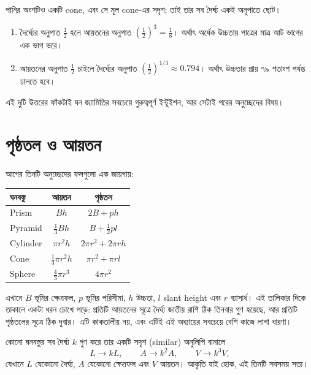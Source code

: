 \documentclass[11pt]{article}
\begin{document}
\begin{sol}
পানির অংশটিও একটি cone, এবং সে মূল cone-এর সদৃশ; তাই তার সব দৈর্ঘ্য একই অনুপাতে
ছোট।
\begin{enumerate}
  \item দৈর্ঘ্যের অনুপাত $\tfrac{1}{2}$ হলে আয়তনের অনুপাত
        $\left( \tfrac{1}{2} \right)^{3} = \tfrac{1}{8}$। অর্থাৎ অর্ধেক উচ্চতায়
        পাত্রের মাত্র আট ভাগের এক ভাগ ভরে।
  \item আয়তনের অনুপাত $\tfrac{1}{2}$ চাইলে দৈর্ঘ্যের অনুপাত
        $\left( \tfrac{1}{2} \right)^{1/3} \approx 0.794$। অর্থাৎ উচ্চতার প্রায়
        ৭৯ শতাংশ পর্যন্ত ঢালতে হবে।
\end{enumerate}
এই দুটি উত্তরের ফাঁকটাই ঘন জ্যামিতির সবচেয়ে গুরুত্বপূর্ণ ইন্টুইশন, আর সেটাই পরের
অনুচ্ছেদের বিষয়।
\end{sol}

\section{পৃষ্ঠতল ও আয়তন}

আগের তিনটি অনুচ্ছেদের ফলগুলো এক জায়গায়:

\begin{center}
\begin{tabular}{l|c|c}
 ঘনবস্তু & আয়তন & পৃষ্ঠতল \\ \hline
 Prism & $Bh$ & $2B + p h$ \\
 Pyramid & $\tfrac{1}{3}Bh$ & $B + \tfrac{1}{2} p l$ \\
 Cylinder & $\pi r^{2} h$ & $2\pi r^{2} + 2\pi r h$ \\
 Cone & $\tfrac{1}{3}\pi r^{2} h$ & $\pi r^{2} + \pi r l$ \\
 Sphere & $\tfrac{4}{3}\pi r^{3}$ & $4\pi r^{2}$ \\
\end{tabular}
\end{center}

এখানে $B$ ভূমির ক্ষেত্রফল, $p$ ভূমির পরিসীমা, $h$ উচ্চতা, $l$ slant height এবং
$r$ ব্যাসার্ধ। এই তালিকার দিকে তাকালে একটা ধরন চোখে পড়ে: প্রতিটি আয়তনের সূত্রে দৈর্ঘ্য জাতীয়
রাশি ঠিক তিনবার গুণ হয়েছে, আর প্রতিটি পৃষ্ঠতলের সূত্রে ঠিক দুবার। এটি কাকতালীয়
নয়, এবং এটিই এই অধ্যায়ের সবচেয়ে বেশি কাজে লাগা ধারণা।

\begin{idea}[স্কেলিং সূত্র]
কোনো ঘনবস্তুর সব দৈর্ঘ্য $k$ গুণ করে তার একটি সদৃশ (similar) অনুলিপি বানালে
\[
  L \to kL, \qquad A \to k^{2}A, \qquad V \to k^{3}V ,
\]
যেখানে $L$ যেকোনো দৈর্ঘ্য, $A$ যেকোনো ক্ষেত্রফল এবং $V$ আয়তন। আকৃতি যাই হোক, এই তিনটি সবসময় সত্য।
\end{idea}
\end{document}
